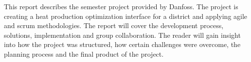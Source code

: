 


\noindent
This report describes the semester project provided by Danfoss. 
The project is creating a heat production optimization interface for a district and applying agile and scrum methodologies.
The report will cover the development process, solutions, implementation and group collaboration.
The reader will gain insight into how the project was structured, how certain challenges were overcome, the planning process and the final product of the project.